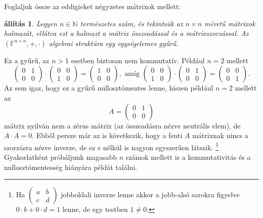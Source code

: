 \documentclass[a4paper, showtrims]{memoir}
\theoremstyle{plain}
\newtheorem{proposition}{állítás}[chapter]
\theoremstyle{remark}
\theoremstyle{definition}
\begin{document}
Foglaljuk össze az eddigieket négyzetes mátrixok mellett:
\begin{proposition}
	Legyen $n\in\mathbb{N}$ természetes szám, és tekintsük az $n\times n$ méretű mátrixok
	halmazát, ellátva ezt a halmazt a mátrix összeadással és a mátrixszorzással.
	Az $\left( \mathbb{F}^{n\times n},+,\cdot \right)$ algebrai struktúra egy egységelemes gyűrű.
\end{proposition}
Ez a gyűrű, az $n>1$ esetben biztosan nem kommutatív.
Például $n=2$ mellett
\[
	\begin{pmatrix}
		0 & 1 \\
		0 & 0
	\end{pmatrix}
	\cdot
	\begin{pmatrix}
		0 & 0 \\
		1 & 0
	\end{pmatrix}
	=
	\begin{pmatrix}
		1 & 0 \\
		0 & 0
	\end{pmatrix},
	\text{ amíg }
	\begin{pmatrix}
		0 & 0 \\
		1 & 0
	\end{pmatrix}
	\cdot
	\begin{pmatrix}
		0 & 1 \\
		0 & 0
	\end{pmatrix}
	=
	\begin{pmatrix}
		0 & 0 \\
		0 & 1
	\end{pmatrix}.
\]
Az sem igaz, hogy ez a gyűrű nullosztómentes lenne, hiszen például $n=2$ mellett az
\[
	A
	=
	\begin{pmatrix}
		0 & 1 \\
		0 & 0
	\end{pmatrix}
\]
mátrix nyilván nem a zérus mátrix (az összeadásra nézve neutrális elem),
de $A\cdot A=0$.
Ebből persze már az is következik, hogy a fenti $A$ mátrixnak nincs a szorzásra nézve inverze,
de ez e nélkül is nagyon egyszerűen látszik.%
\footnote{
	Ha
	\(
	\begin{pmatrix}
		a & b \\
		c & d
	\end{pmatrix}
	\)
	jobboldali inverze lenne akkor a jobb-alsó sarokra figyelve $0\cdot b +0\cdot d=1$ lenne, de egy testben $1\neq 0$.
}
Gyakorlatként próbáljunk magasabb $n$ számok mellett is a kommutativitás és a nullosztómentesség hiányára
példát találni.
\end{document}
